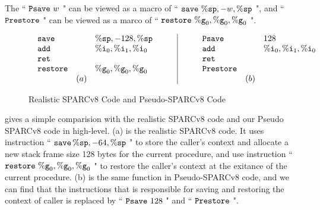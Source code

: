 The `` $\texttt{Psave} \ w$ " can be viewed as a macro of 
`` $\texttt{save}{} \ \%\texttt{sp}, -w, \%\texttt{sp}$ ", and `` $\texttt{Prestore}{}$ " 
can be viewed as a marco of `` $\texttt{restore}{} \ \%\texttt{g}_{0}, \%\texttt{g}_{0}, \%\texttt{g}_{0}$ ". 
\begin{figure}[h]
    \centering
    \[
        \begin{array}{c|c}
            \begin{array}{lcl}
                \texttt{save}{} & \quad & \%\texttt{sp}, -128, \%\texttt{sp} \\
                \texttt{add}{} & & \%\texttt{i}_{0}, \%\texttt{i}_{1}, \%\texttt{i}_{0} \\
                \texttt{ret}{} \\
                \texttt{restore}{} & & \%\texttt{g}_{0}, \%\texttt{g}_{0}, \%\texttt{g}_{0} \\
                & (a)
            \end{array} \qquad & \qquad 
            \begin{array}{lcl}
                \texttt{Psave} & \quad & 128 \\
                \texttt{add}{} & & \%\texttt{i}_{0}, \%\texttt{i}_{1}, \%\texttt{i}_{0} \\
                \texttt{ret}{} \\
                \texttt{Prestore}{} & & \\
                & (b)
            \end{array}
        \end{array}
    \]
    \caption{Realistic SPARCv8 Code and Pseudo-SPARCv8 Code}
    \label{fig:Realistic SPARCv8 Code and Pseudo-SPARCv8 Code}
\end{figure}

\Fig{\ref{fig:Realistic SPARCv8 Code and Pseudo-SPARCv8 Code}} 
gives a simple comparision with the realistic SPARCv8 code 
and our Pseudo SPARCv8 code in high-level. 
\Fig{\ref{fig:Realistic SPARCv8 Code and Pseudo-SPARCv8 Code}} 
(a) is the realistic SPARCv8 code. 
It uses instruction `` $\texttt{save}{} \, \%\texttt{sp}, -64, \%\texttt{sp}$ " 
to store the caller's context and allocate a new stack frame 
size 128 bytes for the current procedure, and use instruction
`` $\texttt{restore}{} \ \%\texttt{g}_{0}, \%\texttt{g}_{0}, \%\texttt{g}_{0}$ " to restore 
the caller's context at the exitance of the current procedure. 
\Fig{\ref{fig:Realistic SPARCv8 Code and Pseudo-SPARCv8 Code}} (b) is 
the same function in Pseudo-SPARCv8 code, 
and we can find that the instructions that 
is responsible for saving and restoring the context of caller
is replaced by `` $\texttt{Psave} \ 128$ " and `` $\texttt{Prestore}$ ". 